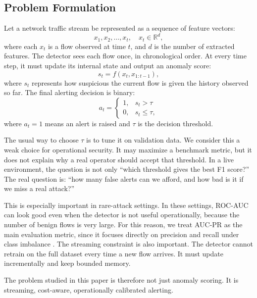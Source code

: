 \documentclass[preprint,12pt,authoryear]{elsarticle}
\begin{document}
\subsection{Problem Formulation}
\label{sec:method-formulation}

Let a network traffic stream be represented as a sequence of feature vectors:
\begin{equation}
    x_1, x_2, \ldots, x_t, \quad x_t \in \mathbb{R}^d,
\end{equation}
where each $x_t$ is a flow observed at time $t$, and $d$ is the number of extracted features. The detector sees each flow once, in chronological order. At every time step, it must update its internal state and output an anomaly score:
\begin{equation}
    s_t = f(x_t, x_{1:t-1}),
\end{equation}
where $s_t$ represents how suspicious the current flow is given the history observed so far. The final alerting decision is binary:
\begin{equation}
    a_t =
    \begin{cases}
        1, & s_t > \tau \\
        0, & s_t \leq \tau,
    \end{cases}
\end{equation}
where $a_t = 1$ means an alert is raised and $\tau$ is the decision threshold.

The usual way to choose $\tau$ is to tune it on validation data. We consider this a weak choice for operational security. It may maximize a benchmark metric, but it does not explain why a real operator should accept that threshold. In a live environment, the question is not only ``which threshold gives the best F1 score?'' The real question is: ``how many false alerts can we afford, and how bad is it if we miss a real attack?''

This is especially important in rare-attack settings. In these settings, ROC-AUC can look good even when the detector is not useful operationally, because the number of benign flows is very large. For this reason, we treat AUC-PR as the main evaluation metric, since it focuses directly on precision and recall under class imbalance \citep{saito2015precision}. The streaming constraint is also important. The detector cannot retrain on the full dataset every time a new flow arrives. It must update incrementally and keep bounded memory.

The problem studied in this paper is therefore not just anomaly scoring. It is streaming, cost-aware, operationally calibrated alerting.
\end{document}
